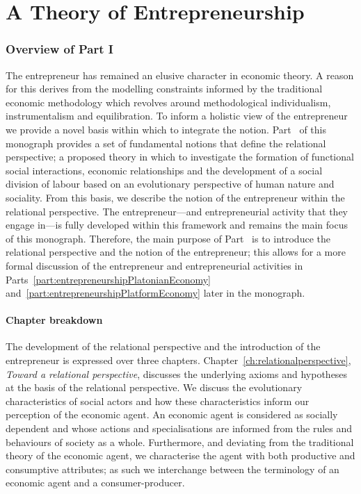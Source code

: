 \part{A Theory of Entrepreneurship} 
\label{part:generalTheoryEntrepreneurship}

\section*{Overview of Part I}

The entrepreneur has remained an elusive character in economic theory. A reason for this derives from the modelling constraints informed by the traditional economic methodology which revolves around methodological individualism, instrumentalism and equilibration. To inform a holistic view of the entrepreneur we provide a novel basis within which to integrate the notion. Part~\ref{part:generalTheoryEntrepreneurship} of this monograph provides a set of fundamental notions that define the relational perspective; a proposed theory in which to investigate the formation of functional social interactions, economic relationships and the development of a social division of labour based on an evolutionary perspective of human nature and sociality. From this basis, we describe the notion of the entrepreneur within the relational perspective. The entrepreneur---and entrepreneurial activity that they engage in---is fully developed within this framework and remains the main focus of this monograph. Therefore, the main purpose of Part~\ref{part:generalTheoryEntrepreneurship} is to introduce the relational perspective and the notion of the entrepreneur; this allows for a more formal discussion of the entrepreneur and entrepreneurial activities in Parts~\ref{part:entrepreneurshipPlatonianEconomy} and~\ref{part:entrepreneurshipPlatformEconomy} later in the monograph.

\subsection*{Chapter breakdown}

The development of the relational perspective and the introduction of the entrepreneur is expressed over three chapters. Chapter~\ref{ch:relationalperspective}, \emph{Toward a relational perspective}, discusses the underlying axioms and hypotheses at the basis of the relational perspective. We discuss the evolutionary characteristics of social actors and how these characteristics inform our perception of the economic agent. An economic agent is considered as socially dependent and whose actions and specialisations are informed from the rules and behaviours of society as a whole. Furthermore, and deviating from the traditional theory of the economic agent, we characterise the agent with both productive and consumptive attributes; as such we interchange between the terminology of an economic agent and a consumer-producer.

